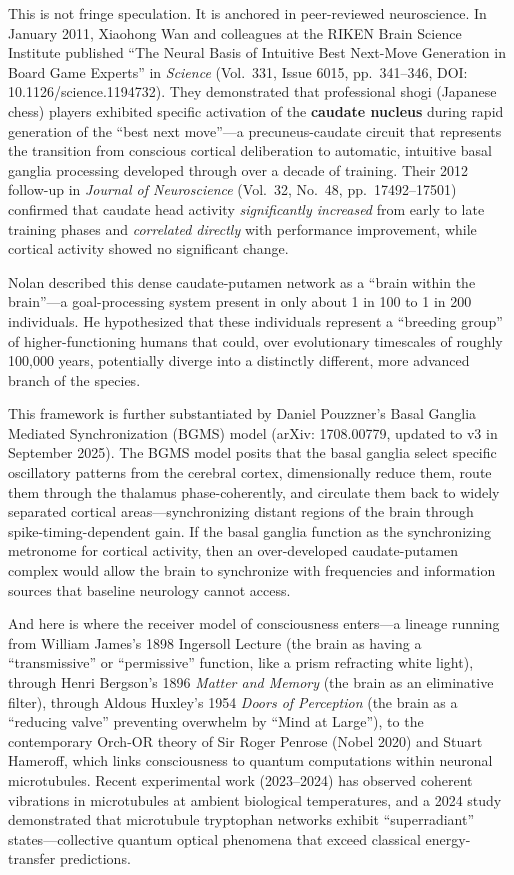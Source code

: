 \documentclass[11pt,a4paper]{article}
\begin{document}
This is not fringe speculation. It is anchored in peer-reviewed neuroscience. In January 2011, Xiaohong Wan and colleagues at the RIKEN Brain Science Institute published ``The Neural Basis of Intuitive Best Next-Move Generation in Board Game Experts'' in \textit{Science} (Vol.\ 331, Issue 6015, pp.\ 341--346, DOI: 10.1126/science.1194732). They demonstrated that professional shogi (Japanese chess) players exhibited specific activation of the \textbf{caudate nucleus} during rapid generation of the ``best next move''---a precuneus-caudate circuit that represents the transition from conscious cortical deliberation to automatic, intuitive basal ganglia processing developed through over a decade of training. Their 2012 follow-up in \textit{Journal of Neuroscience} (Vol.\ 32, No.\ 48, pp.\ 17492--17501) confirmed that caudate head activity \textit{significantly increased} from early to late training phases and \textit{correlated directly} with performance improvement, while cortical activity showed no significant change.

Nolan described this dense caudate-putamen network as a ``brain within the brain''---a goal-processing system present in only about 1 in 100 to 1 in 200 individuals. He hypothesized that these individuals represent a ``breeding group'' of higher-functioning humans that could, over evolutionary timescales of roughly 100,000 years, potentially diverge into a distinctly different, more advanced branch of the species.

This framework is further substantiated by Daniel Pouzzner's Basal Ganglia Mediated Synchronization (BGMS) model (arXiv: 1708.00779, updated to v3 in September 2025). The BGMS model posits that the basal ganglia select specific oscillatory patterns from the cerebral cortex, dimensionally reduce them, route them through the thalamus phase-coherently, and circulate them back to widely separated cortical areas---synchronizing distant regions of the brain through spike-timing-dependent gain. If the basal ganglia function as the synchronizing metronome for cortical activity, then an over-developed caudate-putamen complex would allow the brain to synchronize with frequencies and information sources that baseline neurology cannot access.

And here is where the receiver model of consciousness enters---a lineage running from William James's 1898 Ingersoll Lecture (the brain as having a ``transmissive'' or ``permissive'' function, like a prism refracting white light), through Henri Bergson's 1896 \textit{Matter and Memory} (the brain as an eliminative filter), through Aldous Huxley's 1954 \textit{Doors of Perception} (the brain as a ``reducing valve'' preventing overwhelm by ``Mind at Large''), to the contemporary Orch-OR theory of Sir Roger Penrose (Nobel 2020) and Stuart Hameroff, which links consciousness to quantum computations within neuronal microtubules. Recent experimental work (2023--2024) has observed coherent vibrations in microtubules at ambient biological temperatures, and a 2024 study demonstrated that microtubule tryptophan networks exhibit ``superradiant'' states---collective quantum optical phenomena that exceed classical energy-transfer predictions.
\end{document}
